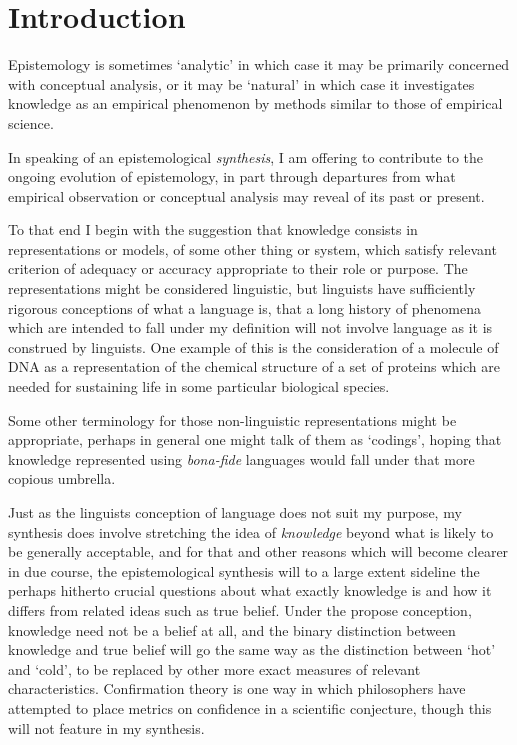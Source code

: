 \documentclass[10pt,titlepage]{book}
\begin{document}
\chapter{Introduction}

Epistemology is sometimes `analytic' in which case it may be primarily concerned with conceptual analysis, or it may be `natural' in which case it investigates knowledge as an empirical phenomenon by methods similar to those of empirical science.

In speaking of an epistemological \emph{synthesis}, I am offering to contribute to the ongoing evolution of epistemology, in part through departures from what empirical observation or conceptual analysis may reveal of its past or present.

To that end I begin with the suggestion that knowledge consists in representations or models, of some other thing or system, which satisfy relevant criterion of adequacy or accuracy appropriate to their role or purpose.
The representations might be considered linguistic, but linguists have sufficiently rigorous conceptions of what a language is, that a long history of phenomena which are intended to fall under my definition will not involve language as it is construed by linguists.
One example of this is the consideration of a molecule of DNA as a representation of the chemical structure of a set of proteins which are needed for sustaining life in some particular biological species.

Some other terminology for those non-linguistic representations might be appropriate, perhaps in general one might talk of them as `codings', hoping that knowledge represented using \emph{bona-fide} languages would fall under that more copious umbrella.

Just as the linguists conception of language does not suit my purpose, my synthesis does involve stretching the idea of \emph{knowledge} beyond what is likely to be generally acceptable, and for that and other reasons which will become clearer in due course, the epistemological synthesis will to a large extent sideline the perhaps hitherto crucial questions about what exactly knowledge is and how it differs from related ideas such as true belief.
Under the propose conception, knowledge need not be a belief at all, and the binary distinction between knowledge and true belief will go the same way as the distinction between `hot' and `cold', to be replaced by other more exact measures of relevant characteristics.
Confirmation theory is one way in which philosophers have attempted to place metrics on confidence in a scientific conjecture, though this will not feature in my synthesis.
\end{document}

